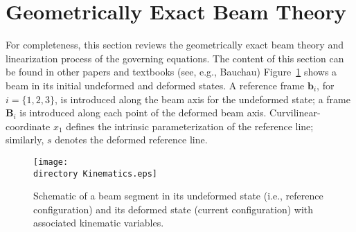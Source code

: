 
\section{Geometrically Exact Beam Theory}

For completeness, this section reviews the geometrically exact beam theory
and linearization process of the governing equations. The content of this
section can be found in other papers and textbooks (see, e.g., 
Bauchau\cite{Bauchau:2010})
Figure~\ref{Kinematics} shows a beam in its initial undeformed and deformed
states. A reference frame $\mathbf{b}_i$, for $i=\{ 1,2,3 \}$, is introduced
along the beam axis for the undeformed state; a frame $\mathbf{B}_i$ is
introduced along each point of the deformed beam axis.
Curvilinear-coordinate $x_1$ defines the intrinsic parameterization of the
reference line; similarly, $s$ denotes the deformed reference line.

\begin{figure}
\centering \texttt{[image: \\directory Kinematics.eps]}
\caption{Schematic of a beam segment in its undeformed state (i.e.,
reference configuration) and its deformed state (current configuration) with
associated kinematic variables.} \label{Kinematics}
\end{figure}

